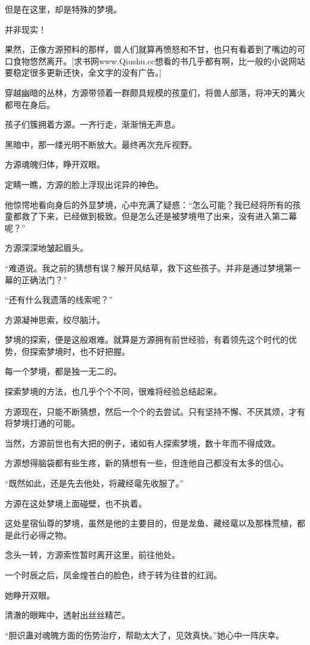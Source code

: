 \begin{this_body}
但是在这里，却是特殊的梦境。

并非现实！

果然，正像方源预料的那样，兽人们就算再愤怒和不甘，也只有看着到了嘴边的可口食物悠然离开。[求书网www.Qiushu.cc想看的书几乎都有啊，比一般的小说网站要稳定很多更新还快，全文字的没有广告。]

穿越幽暗的丛林，方源带领着一群颇具规模的孩童们，将兽人部落，将冲天的篝火都甩在身后。

孩子们簇拥着方源。一齐行走，渐渐悄无声息。

黑暗中，那一缕光明不断放大。最终再次充斥视野。

方源魂魄归体，睁开双眼。

定睛一瞧，方源的脸上浮现出诧异的神色。

他惊愕地看向身后的外显梦境，心中充满了疑惑：“怎么可能？我已经将所有的孩童都救了下来，已经做到极致。但是怎么还是被梦境甩了出来，没有进入第二幕呢？”

方源深深地皱起眉头。

“难道说。我之前的猜想有误？解开风结草，救下这些孩子。并非是通过梦境第一幕的正确法门？”

“还有什么我遗落的线索呢？”

方源凝神思索，绞尽脑汁。

梦境的探索，便是这般艰难。就算是方源拥有前世经验，有着领先这个时代的优势，但探索梦境时，也不好把握。

每一个梦境，都是独一无二的。

探索梦境的方法，也几乎个个不同，很难将经验总结起来。

方源现在，只能不断猜想，然后一个个的去尝试。只有坚持不懈、不厌其烦，才有将梦境打通的可能。

当然，方源前世也有大把的例子，诸如有人探索梦境，数十年而不得成效。

方源想得脑袋都有些生疼，新的猜想有一些，但连他自己都没有太多的信心。

“既然如此，还是先去他处，将藏经鼋先收服了。”

方源在这处梦境上面碰壁，也不执着。

这处星宿仙尊的梦境，虽然是他的主要目的，但是龙鱼、藏经鼋以及那株荒植，都是此行必得之物。

念头一转，方源索性暂时离开这里，前往他处。

一个时辰之后，凤金煌苍白的脸色，终于转为往昔的红润。

她睁开双眼。

清澈的眼眸中，透射出丝丝精芒。

“胆识蛊对魂魄方面的伤势治疗，帮助太大了，见效真快。”她心中一阵庆幸。


\end{this_body}
